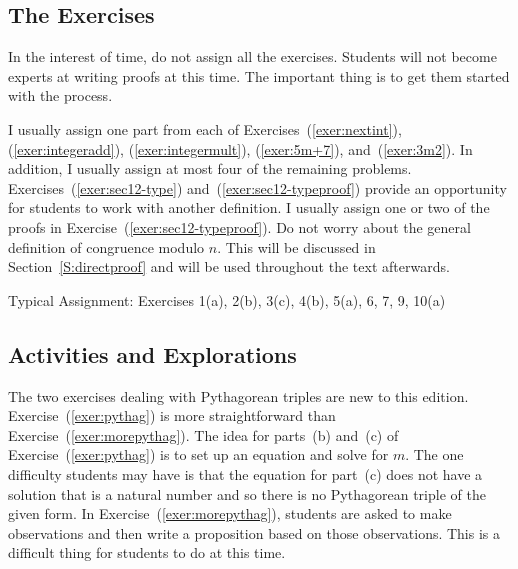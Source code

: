 \subsection*{The Exercises}

In the interest of time, do not assign all the exercises.  Students will not become experts at writing proofs at this time.  The important thing is to get them started with the process.


I usually assign one part from each of Exercises~(\ref{exer:nextint}), (\ref{exer:integeradd}), (\ref{exer:integermult}), (\ref{exer:5m+7}), and~(\ref{exer:3m2}).  In addition, I usually assign at most four of the remaining problems.  
Exercises~(\ref{exer:sec12-type}) and~(\ref{exer:sec12-typeproof}) provide an opportunity for students to work with another definition.  I usually assign one or two of the proofs in Exercise~(\ref{exer:sec12-typeproof}).  Do not worry about the general definition of congruence modulo $n$.  This will be discussed in Section~\ref{S:directproof} and will be used throughout the text afterwards.

\vskip6pt
\noindent
Typical Assignment:  Exercises 1(a), 2(b), 3(c), 4(b), 5(a), 6, 7, 9, 10(a)
\hbreak

\subsection*{Activities and Explorations}
The two exercises dealing with Pythagorean triples are new to this edition.  Exercise~(\ref{exer:pythag}) is more straightforward than Exercise~(\ref{exer:morepythag}).  The idea for parts~(b) and~(c) of Exercise~(\ref{exer:pythag}) is to set up an equation and solve for $m$.  The one difficulty students may have is that the equation for part~(c) does not have a solution that is a natural number and so there is no Pythagorean triple of the given form.  In Exercise~(\ref{exer:morepythag}), students are asked to make observations and then write a proposition based on those observations.  This is a difficult thing for students to do at this time.
\hbreak











\endinput
